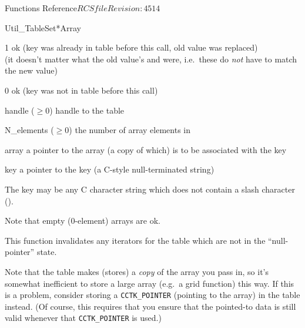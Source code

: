 \begin{cactuspart}{ Functions Reference}{$RCSfile$}{$Revision: 4514 $}
\begin{FunctionDescription}{Util\_TableSet*Array}
\begin{ResultSection}
\begin{Result}{\rm 1}
ok (key was already in table before this call, old value was replaced)\\
   (it doesn't matter what the old value's  and
     were, i.e.\ these do {\em not\/} have to match
    the new value)
\end{Result}
\begin{Result}{\rm 0}
ok (key was not in table before this call)
\end{Result}
\end{ResultSection}

\begin{ParameterSection}
\begin{Parameter}{handle ($\ge 0$)}
handle to the table
\end{Parameter}
\begin{Parameter}{N\_elements ($\ge 0$)}
the number of array elements in 
\end{Parameter}
\begin{Parameter}{array}
a pointer to the array (a copy of which) is to be associated with the key
\end{Parameter}
\begin{Parameter}{key}
a pointer to the key (a C-style null-terminated string)
\end{Parameter}
\end{ParameterSection}

\begin{Discussion}
The key may be any C character string which does not contain a slash
character ().

Note that empty (0-element) arrays are ok.

This function invalidates any iterators for the table which are
not in the ``null-pointer'' state.

Note that the table makes (stores) a \emph{copy} of the array
you pass in, so it's somewhat inefficient to store a large array
(e.g.~a grid function) this way.  If this is a problem, consider
storing a \verb|CCTK_POINTER| (pointing to the array) in the table
instead.  (Of course, this requires that you ensure that the pointed-to
data is still valid whenever that \verb|CCTK_POINTER| is used.)
\end{Discussion}


\end{FunctionDescription}
\end{cactuspart}
